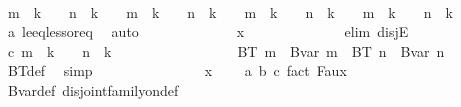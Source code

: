 \begin{isabellebody}
\ \ \ \ \ \ \ \ \ \ \isamarkupfalse%
\ {\isachardoublequoteopen}m\ {\isacharless}{\kern0pt}\ k\ {\isacharplus}{\kern0pt}\ {}\ {\isasymand}\ n\ {\isacharless}{\kern0pt}\ k\ {\isacharplus}{\kern0pt}\ {}\ {\isasymor}\ m\ {\isacharequal}{\kern0pt}\ k\ {\isacharplus}{\kern0pt}\ {}\ {\isasymand}\ n\ {\isacharequal}{\kern0pt}\ k\ {\isacharplus}{\kern0pt}\ {}\ {\isasymor}\ m\ {\isacharless}{\kern0pt}\ k\ {\isacharplus}{\kern0pt}\ {}\ {\isasymand}\ n\ {\isacharequal}{\kern0pt}\ k\ {\isacharplus}{\kern0pt}\ {}\ {\isasymor}\ m\ {\isacharequal}{\kern0pt}\ k\ {\isacharplus}{\kern0pt}\ {}\ {\isasymand}\ n\ {\isacharless}{\kern0pt}\ k\ {\isacharplus}{\kern0pt}\ {}{\isachardoublequoteclose}\ \isamarkupfalse%
\ a\ le{\isacharunderscore}{\kern0pt}eq{\isacharunderscore}{\kern0pt}less{\isacharunderscore}{\kern0pt}or{\isacharunderscore}{\kern0pt}eq\ \isamarkupfalse%
\ auto\isanewline
\ \ \ \ \ \ \ \ \ \ \isamarkupfalse%
\ \isamarkupfalse%
\ {\isachardoublequoteopen}x\ {\isasymin}\ {\isacharbraceleft}{\kern0pt}{\isacharbraceright}{\kern0pt}{\isachardoublequoteclose}\isanewline
\ \ \ \ \ \ \ \ \ \ \isamarkupfalse%
\ {\isacharparenleft}{\kern0pt}elim\ disjE{\isacharparenright}{\kern0pt}\isanewline
\ \ \ \ \ \ \ \ \ \ \ \ \isamarkupfalse%
\ c{\isacharcolon}{\kern0pt}\ {\isachardoublequoteopen}m\ {\isacharless}{\kern0pt}\ k\ {\isacharplus}{\kern0pt}\ {}\ {\isasymand}\ n\ {\isacharless}{\kern0pt}\ k\ {\isacharplus}{\kern0pt}\ {}{\isachardoublequoteclose}\isanewline
\ \ \ \ \ \ \ \ \ \ \ \ \isamarkupfalse%
\ \isamarkupfalse%
\ {\isachardoublequoteopen}BT\ m\ {\isacharequal}{\kern0pt}\ Bvar\ m\ {\isasymand}\ BT\ n\ {\isacharequal}{\kern0pt}\ Bvar\ n{\isachardoublequoteclose}\ \isamarkupfalse%
\ BT{\isacharunderscore}{\kern0pt}def\ \isamarkupfalse%
\ simp\isanewline
\ \ \ \ \ \ \ \ \ \ \ \ \isamarkupfalse%
\ \isamarkupfalse%
\ {\isachardoublequoteopen}x\ {\isasymin}\ {\isacharbraceleft}{\kern0pt}{\isacharbraceright}{\kern0pt}{\isachardoublequoteclose}\ \isamarkupfalse%
\ a\ b\ c\ fact{}\ F{}{\isacharunderscore}{\kern0pt}aux\ \isamarkupfalse%
\ Bvar{\isacharunderscore}{\kern0pt}def\ disjoint{\isacharunderscore}{\kern0pt}family{\isacharunderscore}{\kern0pt}on{\isacharunderscore}{\kern0pt}def\ \isamarkupfalse%

\end{isabellebody}
